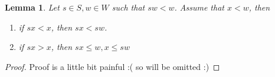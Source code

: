 \documentclass[12pt]{amsart}
\numberwithin{equation}{section}
\theoremstyle{plain}
\newtheorem{lemma}[theorem]{Lemma}
\theoremstyle{definition}
\begin{document}
\begin{lemma}
	Let $s\in S,w\in W$ such that $sw<w$. Assume that $x<w$, then
	\begin{enumerate}[]
		\item if $sx<x$, then $sx<sw$.
		\item if $sx>x$, then $sx\leq w,x\leq sw$
	\end{enumerate}
\end{lemma}
\begin{proof}
	Proof is a little bit painful :( so will be omitted :)
\end{proof}




















\end{document}
